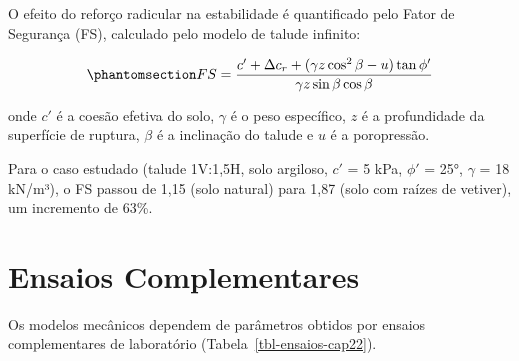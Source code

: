 \documentclass[
  portuguese,
  11pt,
  a4paper,
  open=any]{scrbook}
\begin{document}
O efeito do reforço radicular na estabilidade é quantificado pelo Fator
de Segurança (FS), calculado pelo modelo de talude infinito:

\begin{equation}\phantomsection\label{eq-fs-cap22}{FS = \frac{c' + \Delta c_r + (\gamma z \cos^2\beta - u)\tan\phi'}{\gamma z \sin\beta \cos\beta}}\end{equation}

onde \(c'\) é a coesão efetiva do solo, \(\gamma\) é o peso específico,
\(z\) é a profundidade da superfície de ruptura, \(\beta\) é a
inclinação do talude e \(u\) é a poropressão.

Para o caso estudado (talude 1V:1,5H, solo argiloso, \(c'\) = 5 kPa,
\(\phi'\) = 25°, \(\gamma\) = 18 kN/m³), o FS passou de 1,15 (solo
natural) para 1,87 (solo com raízes de vetiver), um incremento de 63\%.

\section{Ensaios Complementares}\label{ensaios-complementares}

Os modelos mecânicos dependem de parâmetros obtidos por ensaios
complementares de laboratório (Tabela~\ref{tbl-ensaios-cap22}).
\end{document}
